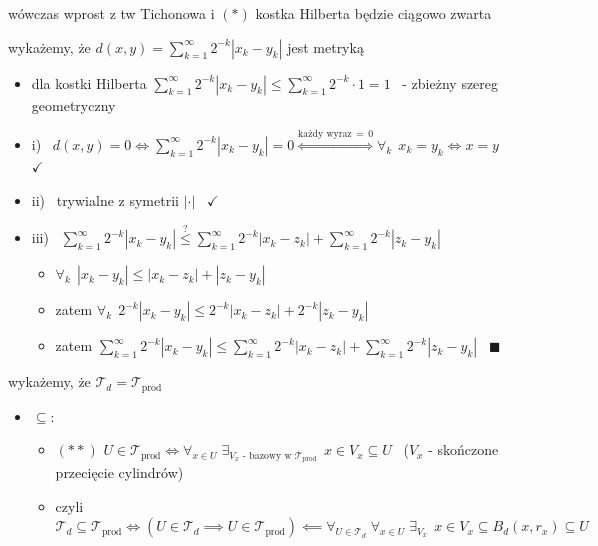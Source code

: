 \documentclass[a4paper,12pt]{article}
\begin{document}
wówczas wprost z tw Tichonowa i \((*)\) kostka Hilberta będzie ciągowo zwarta
\begin{steps}
    \item wykażemy, że \(d(x, y) = \displaystyle\sum_{k=1}^{\infty} 2^{-k} |x_k - y_k|\) jest metryką
    \begin{itemize}
        \item dla kostki Hilberta \(\displaystyle\sum_{k=1}^{\infty} 2^{-k} |x_k - y_k| \leq \displaystyle\sum_{k=1}^{\infty} 2^{-k} \cdot 1 = 1\) \, - zbieżny szereg geometryczny
        \item i) \, \(d(x, y) = 0 \iff \displaystyle\sum_{k=1}^{\infty} 2^{-k} |x_k - y_k| = 0 \overset{\text{każdy wyraz} \, = \, 0}{\iff} \forall_k \;\, x_k = y_k \iff x = y\) \, \(\checkmark\)
        \item ii) \, trywialne z symetrii \(|\cdot|\) \, \(\checkmark\)
        \item iii) \, \(\displaystyle\sum_{k=1}^{\infty} 2^{-k} |x_k - y_k| \overset{?}{\leq} \displaystyle\sum_{k=1}^{\infty} 2^{-k} |x_k - z_k| + \displaystyle\sum_{k=1}^{\infty} 2^{-k} |z_k - y_k|\)
        \begin{itemize}
            \item \(\forall_k \;\, |x_k - y_k| \leq |x_k - z_k| + |z_k - y_k|\)
            \item zatem \(\forall_k \;\, 2^{-k} |x_k - y_k| \leq 2^{-k} |x_k - z_k| + 2^{-k} |z_k - y_k|\)
            \item zatem \(\displaystyle\sum_{k=1}^{\infty} 2^{-k} |x_k - y_k| \leq \displaystyle\sum_{k=1}^{\infty} 2^{-k} |x_k - z_k| + \displaystyle\sum_{k=1}^{\infty} 2^{-k} |z_k - y_k|\) \, \(\blacksquare\)
        \end{itemize}
    \end{itemize}
    \item wykażemy, że \(\mathcal{T}_d = \mathcal{T}_{\text{prod}}\)
    \begin{itemize}
        \item \(\subseteq\):
        \begin{itemize}
            \item \((**)\) \; \(U \in \mathcal{T}_{\text{prod}} \iff \forall_{x \in U} \; \exists_{V_x \text{ - bazowy w } \mathcal{T}_{\text{prod}}} \;\, x \in V_x \subseteq U\) \, (\(V_x\) - skończone przecięcie cylindrów)
            \item czyli \(\mathcal{T}_d \subseteq \mathcal{T}_{\text{prod}} \iff (U \in \mathcal{T}_d \implies U \in \mathcal{T}_{\text{prod}}) \impliedby \forall_{U \in \mathcal{T}_d} \; \forall_{x \in U} \; \exists_{V_x} \;\, x \in V_x \subseteq B_d(x, r_x) \subseteq U\)

\end{itemize}
\end{itemize}
\end{steps}
\end{document}
